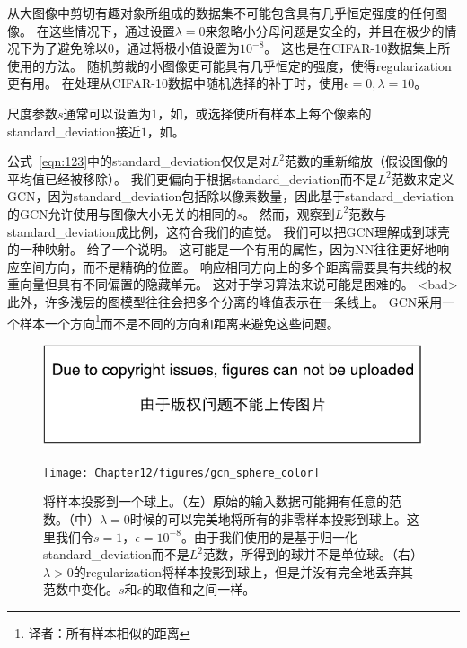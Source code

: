 从大图像中剪切有趣对象所组成的数据集不可能包含具有几乎恒定强度的任何图像。
在这些情况下，通过设置$\lambda = 0$来忽略小分母问题是安全的，并且在极少的情况下为了避免除以$0$，通过将极小值设置为$10^{-8}$。
这也是\citet{Goodfellow+al-arxiv-2013}在CIFAR-10数据集上所使用的方法。
随机剪裁的小图像更可能具有几乎恒定的强度，使得\gls{regularization}更有用。
在处理从CIFAR-10数据中随机选择的补丁时，\citet{Coates2011}使用$\epsilon = 0, \lambda = 10$。

尺度参数$s$通常可以设置为$1$，如\citet{Coates2011}，或选择使所有样本上每个像素的\gls{standard_deviation}接近$1$，如\citet{Goodfellow+al-arxiv-2013}。

公式~\eqref{eqn:123}中的\gls{standard_deviation}仅仅是对$L^2$范数的重新缩放（假设图像的平均值已经被移除）。
我们更偏向于根据\gls{standard_deviation}而不是$L^2$范数来定义\gls{GCN}，因为\gls{standard_deviation}包括除以像素数量，因此基于\gls{standard_deviation}的\gls{GCN}允许使用与图像大小无关的相同的$s$。
然而，观察到$L^2$范数与\gls{standard_deviation}成比例，这符合我们的直觉。
我们可以把\gls{GCN}理解成到球壳的一种映射。
给了一个说明。
这可能是一个有用的属性，因为\gls{NN}往往更好地响应空间方向，而不是精确的位置。
响应相同方向上的多个距离需要具有共线的权重向量但具有不同偏置的隐藏单元。
这对于学习算法来说可能是困难的。
<bad>此外，许多浅层的图模型往往会把多个分离的峰值表示在一条线上。
\gls{GCN}采用一个样本一个方向\footnote{译者：所有样本相似的距离}而不是不同的方向和距离来避免这些问题。

\begin{figure}[!htb]
\ifOpenSource
\centerline{\includegraphics{figure.pdf}}
\else
	\centerline{\texttt{[image: Chapter12/figures/gcn\_sphere\_color]}}
\fi
	\caption{将样本投影到一个球上。（左）原始的输入数据可能拥有任意的范数。（中）$\lambda=0$时候的可以完美地将所有的非零样本投影到球上。这里我们令$s=1$，$\epsilon = 10^{-8}$。由于我们使用的是基于归一化\gls{standard_deviation}而不是$L^2$范数，所得到的球并不是单位球。（右）$\lambda>0$的\gls{regularization}将样本投影到球上，但是并没有完全地丢弃其范数中变化。$s$和$\epsilon$的取值和之间一样。}
	\label{fig:gcn_sphere_color}
\end{figure}


